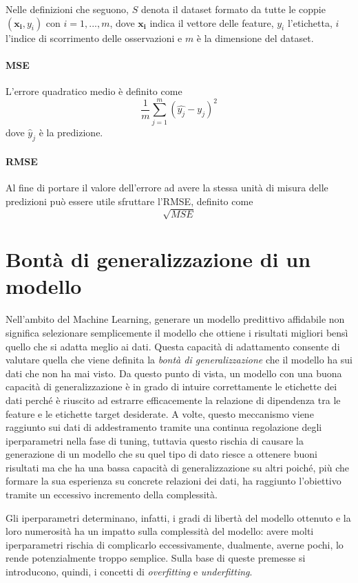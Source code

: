 \documentclass[12pt]{report}
\theoremstyle{definition}
\begin{document}
Nelle definizioni che seguono, $S$ denota il dataset formato da tutte le coppie $(\mathbf{x_i},y_i)$ con $i=1, ..., m$,
dove $\mathbf{x_i}$ indica il vettore delle feature, $y_i$ l'etichetta, $i$ l'indice di scorrimento delle osservazioni e $m$ è la dimensione del dataset.
\paragraph{MSE} L'errore quadratico medio è definito come
\begin{equation}
    \frac{1}{m}\sum\limits_{j=1}^m (\hat{y_j} - y_j)^2
\end{equation}
dove $\hat{y}_j$ è la predizione.
\paragraph{RMSE}
Al fine di portare il valore dell'errore ad avere la stessa unità di misura delle predizioni può essere utile sfruttare l'RMSE, definito come 
\begin{equation}
    \sqrt{MSE}
\end{equation}

\section{Bontà di generalizzazione di un modello}\label{generalization}
Nell'ambito del Machine Learning, generare un modello predittivo affidabile non significa selezionare semplicemente il modello che ottiene i risultati migliori bensì quello che si adatta meglio ai dati.
Questa capacità di adattamento consente di valutare quella che viene definita la \textit{bontà di generalizzazione} che il modello ha sui dati che non ha mai visto. Da questo punto di vista, un modello con una buona capacità di generalizzazione è in grado di intuire correttamente le etichette dei dati perché è riuscito ad estrarre efficacemente la relazione di dipendenza tra le feature e le etichette target desiderate.
A volte, questo meccanismo viene raggiunto sui dati di addestramento tramite una continua regolazione degli iperparametri nella fase di tuning, tuttavia questo rischia di causare la generazione di un modello che su quel tipo di dato riesce a ottenere buoni risultati ma che ha una bassa capacità di generalizzazione su altri poiché, più che formare la sua esperienza su concrete relazioni dei dati, ha raggiunto l'obiettivo tramite un eccessivo incremento della complessità.

Gli iperparametri determinano, infatti, i gradi di libertà del modello ottenuto e la loro numerosità ha un impatto sulla complessità del modello: avere molti iperparametri rischia di complicarlo eccessivamente, dualmente, averne pochi, lo rende potenzialmente troppo semplice. 
Sulla base di queste premesse si introducono, quindi, i concetti di \textit{overfitting} e \textit{underfitting}.
\end{document}
